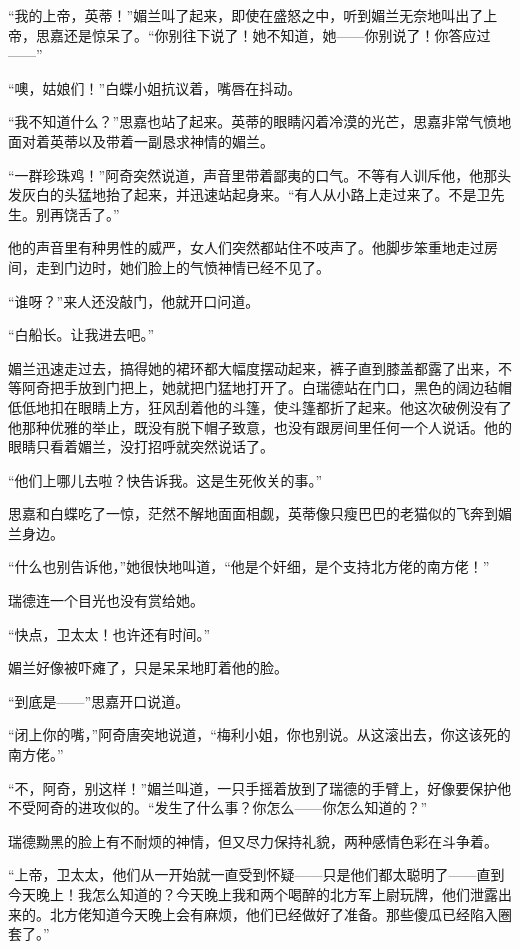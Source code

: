 \par “我的上帝，英蒂！”媚兰叫了起来，即使在盛怒之中，听到媚兰无奈地叫出了上帝，思嘉还是惊呆了。“你别往下说了！她不知道，她——你别说了！你答应过——”
\par “噢，姑娘们！”白蝶小姐抗议着，嘴唇在抖动。
\par “我不知道什么？”思嘉也站了起来。英蒂的眼睛闪着冷漠的光芒，思嘉非常气愤地面对着英蒂以及带着一副恳求神情的媚兰。
\par “一群珍珠鸡！”阿奇突然说道，声音里带着鄙夷的口气。不等有人训斥他，他那头发灰白的头猛地抬了起来，并迅速站起身来。“有人从小路上走过来了。不是卫先生。别再饶舌了。”
\par 他的声音里有种男性的威严，女人们突然都站住不吱声了。他脚步笨重地走过房间，走到门边时，她们脸上的气愤神情已经不见了。
\par “谁呀？”来人还没敲门，他就开口问道。
\par “白船长。让我进去吧。”
\par 媚兰迅速走过去，搞得她的裙环都大幅度摆动起来，裤子直到膝盖都露了出来，不等阿奇把手放到门把上，她就把门猛地打开了。白瑞德站在门口，黑色的阔边毡帽低低地扣在眼睛上方，狂风刮着他的斗篷，使斗篷都折了起来。他这次破例没有了他那种优雅的举止，既没有脱下帽子致意，也没有跟房间里任何一个人说话。他的眼睛只看着媚兰，没打招呼就突然说话了。
\par “他们上哪儿去啦？快告诉我。这是生死攸关的事。”
\par 思嘉和白蝶吃了一惊，茫然不解地面面相觑，英蒂像只瘦巴巴的老猫似的飞奔到媚兰身边。
\par “什么也别告诉他，”她很快地叫道，“他是个奸细，是个支持北方佬的南方佬！”
\par 瑞德连一个目光也没有赏给她。
\par “快点，卫太太！也许还有时间。”
\par 媚兰好像被吓瘫了，只是呆呆地盯着他的脸。
\par “到底是——”思嘉开口说道。
\par “闭上你的嘴，”阿奇唐突地说道，“梅利小姐，你也别说。从这滚出去，你这该死的南方佬。”
\par “不，阿奇，别这样！”媚兰叫道，一只手摇着放到了瑞德的手臂上，好像要保护他不受阿奇的进攻似的。“发生了什么事？你怎么——你怎么知道的？”
\par 瑞德黝黑的脸上有不耐烦的神情，但又尽力保持礼貌，两种感情色彩在斗争着。
\par “上帝，卫太太，他们从一开始就一直受到怀疑——只是他们都太聪明了——直到今天晚上！我怎么知道的？今天晚上我和两个喝醉的北方军上尉玩牌，他们泄露出来的。北方佬知道今天晚上会有麻烦，他们已经做好了准备。那些傻瓜已经陷入圈套了。”

